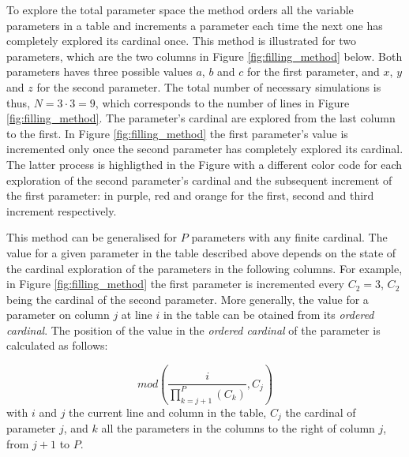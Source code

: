 \documentclass[a4paper, 12pt]{article}
\begin{document}
To explore the total parameter space the method orders all the variable parameters in a table and increments a parameter each time the next one has completely explored its cardinal once. This method is illustrated for two parameters, which are the two columns in Figure \ref{fig:filling_method} below. Both parameters haves three possible values $a$, $b$ and $c$ for the first parameter, and $x$, $y$ and $z$ for the second parameter. The total number of necessary simulations is thus, $N = 3 \cdot 3 = 9$, which corresponds to the number of lines in Figure \ref{fig:filling_method}. The parameter's cardinal are explored from the last column to the first. In Figure \ref{fig:filling_method} the first parameter's value is incremented only once the second parameter has completely explored its cardinal. The latter process is highligthed in the Figure with a different color code for each exploration of the second parameter's cardinal and the subsequent increment of the first parameter: in \color{purple}purple\color{black}, \color{red}red\color{black}\hspace{0.05cm} and \color{orange}orange\color{black}\hspace{0.05cm} for the \color{purple}first\color{black}\hspace{0.05cm}, \color{red}second\color{black}\hspace{0.05cm} and \color{orange}third\color{black}\hspace{0.05cm} increment respectively.\newline

This method can be generalised for $P$ parameters with any finite cardinal. The value for a given parameter in the table described above depends on the state of the cardinal exploration of the parameters in the following columns. For example, in Figure \ref{fig:filling_method} the first parameter is incremented every $C_{2} = 3$, $C_{2}$ being the cardinal of the second parameter. More generally, the value for a parameter on column $j$ at line $i$ in the table can be otained from its \textit{ordered cardinal}. The position of the value in the \textit{ordered cardinal} of the parameter is calculated as follows:

$$ mod( \frac{i}{\prod_{k=j+1}^{P}(C_{k})} , C_{j}) $$
with $i$ and $j$ the current line and column in the table, $C_{j}$ the cardinal of parameter $j$, and $k$ all the parameters in the columns to the right of column $j$, from $j+1$ to $P$.


 
 
\end{document}
